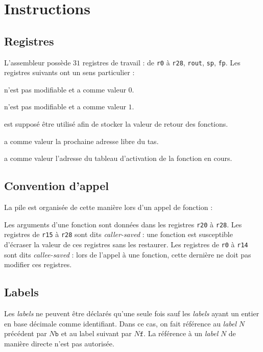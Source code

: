 \documentclass[french, 12pt]{article}
\begin{document}
\section*{Instructions}

\subsection*{Registres}

L'assembleur possède $31$ registres de travail : de \texttt{r0} à \texttt{r28},
\texttt{rout}, \texttt{sp}, \texttt{fp}. Les registres suivants ont un sens
particulier :

\begin{description}[leftmargin=!, labelwidth=\widthof{\bf \texttt{rout}}]
      \item[\texttt{r0}] n'est pas modifiable et a comme valeur $0$.
      \item[\texttt{r1}] n'est pas modifiable et a comme valeur $1$.
      \item[\texttt{rout}] est supposé être utilisé afin de stocker la valeur de retour des fonctions.
      \item[\texttt{sp}] a comme valeur la prochaine adresse libre du tas.
      \item[\texttt{fp}] a comme valeur l'adresse du tableau d'activation de la fonction en cours.
\end{description}

\subsection*{Convention d'appel}

La pile est organisée de cette manière lors d'un appel de fonction :


Les arguments d'une fonction sont données dans les registres \texttt{r20} à \texttt{r28}.
Les registres de \texttt{r15} à \texttt{r28} sont dits \emph{caller-saved} :
une fonction est susceptible d'écraser la valeur de ces registres sans les restaurer.
Les registres de \texttt{r0} à \texttt{r14} sont dits \emph{callee-saved} :
lors de l'appel à une fonction, cette dernière ne doit pas modifier ces registres.

\subsection*{Labels}

Les \emph{labels} ne peuvent être déclarés qu'une seule fois sauf les
\emph{labels} ayant un entier en base décimale comme identifiant. Dans ce cas,
on fait référence au \emph{label} $N$ précédent par $N\texttt{b}$ et au label
suivant par $N\texttt{f}$. La référence à un \emph{label} $N$ de manière directe
n'est pas autorisée.
\end{document}
